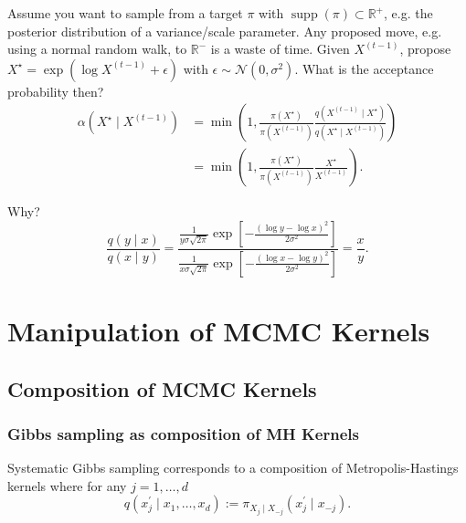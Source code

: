 \documentclass{article}
\begin{document}
Assume you want to sample from a target $\pi$ with $\operatorname{supp}(\pi) \subset \mathbb{R}^{+}$, e.g. the posterior distribution of a variance/scale parameter.
Any proposed move, e.g. using a normal random walk, to $\mathbb{R}^{-}$ is a waste of time.
Given $X^{(t-1)}$, propose $X^{\star}=\exp \left(\log X^{(t-1)}+\epsilon\right)$ with $\epsilon \sim \mathcal{N}\left(0, \sigma^2\right)$. What is the acceptance probability then?
$$
\begin{aligned}
\alpha\left(X^{\star} \mid X^{(t-1)}\right) & =\min \left(1, \frac{\pi\left(X^{\star}\right)}{\pi\left(X^{(t-1)}\right)} \frac{q\left(X^{(t-1)} \mid X^{\star}\right)}{q\left(X^{\star} \mid X^{(t-1)}\right)}\right) \\
& =\min \left(1, \frac{\pi\left(X^{\star}\right)}{\pi\left(X^{(t-1)}\right)} \frac{X^{\star}}{X^{(t-1)}}\right) .
\end{aligned}
$$

Why?
$$
\frac{q(y \mid x)}{q(x \mid y)}=\frac{\frac{1}{y \sigma \sqrt{2 \pi}} \exp \left[-\frac{(\log y-\log x)^2}{2 \sigma^2}\right]}{\frac{1}{x \sigma \sqrt{2 \pi}} \exp \left[-\frac{(\log x-\log y)^2}{2 \sigma^2}\right]}=\frac{x}{y} .
$$
\section{Manipulation of MCMC Kernels}
\subsection{Composition of MCMC Kernels}
\subsubsection{Gibbs sampling as composition of MH Kernels}
Systematic Gibbs sampling corresponds to a composition of Metropolis-Hastings kernels where for any $j=1, \ldots, d$
$$
q\left(x_j^{\prime} \mid x_1, \ldots, x_d\right):=\pi_{X_j \mid X_{-j}}\left(x_j^{\prime} \mid x_{-j}\right) .
$$
\end{document}
